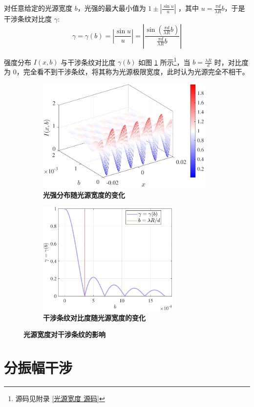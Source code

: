 \documentclass[UTF8]{report}
\theoremstyle{MyLineTheoremStyle} %
\theoremstyle{MyBlockTheoremStyle} %
\theoremstyle{MySubsubsectionStyle} %
\begin{document}
对任意给定的光源宽度 $b$，光强的最大最小值为 $1 \pm \left|  \frac{\sin u}{u} \right|$ ，其中 $u = \frac{\pi d}{\lambda R} b$，于是干涉条纹对比度 $\gamma$:
\begin{equation}
    \gamma = \gamma(b) = \left| \frac{\sin u}{u} \right| = \left| \frac{\sin \left( \frac{\pi d}{\lambda R} b \right)}{\frac{\pi d}{\lambda R} b} \right|
\end{equation}

强度分布 $I(x, b)$ 与干涉条纹对比度 $\gamma(b)$ 如图 \ref{光源宽度} 所示\footnote{源码见附录 \ref{光源宽度 源码}}，当 $b = \frac{\lambda R}{d}$ 时，对比度为 0，完全看不到干涉条纹，将其称为光源极限宽度，此时认为光源完全不相干。

\begin{figure}[H]\centering
\begin{subfigure}[t]{0.5\columnwidth}\centering
    \includegraphics[height=160pt]{assets/3/光强分布.pdf}
    \caption{\bfseries 光强分布随光源宽度的变化 }
\end{subfigure}\hfill
\begin{subfigure}[t]{0.5\columnwidth}\centering
    \includegraphics[height=160pt]{assets/3/干涉条纹对比度.pdf}
    \caption{\bfseries 干涉条纹对比度随光源宽度的变化 }
\end{subfigure}
\caption{\bfseries 光源宽度对干涉条纹的影响 }\label{光源宽度}
\end{figure}

\section{分振幅干涉}
\end{document}
